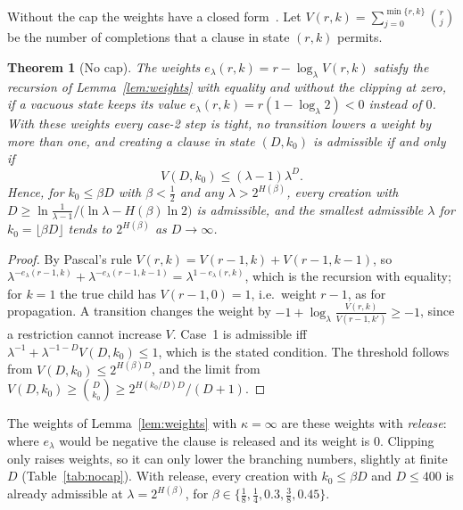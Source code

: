 \documentclass[11pt,a4paper]{article}
\newtheorem{theorem}{Theorem}
\theoremstyle{remark}
\begin{document}
Without the cap the weights have a closed form~\cite{N5}. Let
$V(r,k)=\sum_{j=0}^{\min\{r,k\}}\binom rj$ be the number of completions that a
clause in state $(r,k)$ permits.

\begin{theorem}[No cap]\label{thm:nocap}
The weights $e_\lambda(r,k)=r-\log_\lambda V(r,k)$ satisfy the recursion of
Lemma~\ref{lem:weights} with equality and without the clipping at zero, if a
vacuous state keeps its value $e_\lambda(r,k)=r(1-\log_\lambda2)<0$ instead of
$0$. With these weights every case-2 step is tight, no transition lowers a
weight by more than one, and creating a clause in state $(D,k_0)$ is admissible
if and only if
\[
 V(D,k_0)\le(\lambda-1)\lambda^D .
\]
Hence, for $k_0\le\beta D$ with $\beta<\frac12$ and any $\lambda>2^{H(\beta)}$,
every creation with $D\ge\ln\frac1{\lambda-1}\big/\bigl(\ln\lambda-H(\beta)\ln2
\bigr)$ is admissible, and the smallest admissible $\lambda$ for
$k_0=\lfloor\beta D\rfloor$ tends to $2^{H(\beta)}$ as $D\to\infty$.
\end{theorem}

\begin{proof}
By Pascal's rule $V(r,k)=V(r-1,k)+V(r-1,k-1)$, so
$\lambda^{-e_\lambda(r-1,k)}+\lambda^{-e_\lambda(r-1,k-1)}=\lambda^{1-e_\lambda(r,k)}$,
which is the recursion with equality; for $k=1$ the true child has
$V(r-1,0)=1$, i.e.\ weight $r-1$, as for propagation. A transition changes the
weight by $-1+\log_\lambda\frac{V(r,k)}{V(r-1,k')}\ge-1$, since a restriction
cannot increase $V$. Case~1 is admissible iff
$\lambda^{-1}+\lambda^{-1-D}V(D,k_0)\le1$, which is the stated condition. The
threshold follows from $V(D,k_0)\le2^{H(\beta)D}$, and the limit from
$V(D,k_0)\ge\binom D{k_0}\ge2^{H(k_0/D)D}/(D+1)$.
\end{proof}

The weights of Lemma~\ref{lem:weights} with $\kappa=\infty$ are these weights
with \emph{release}: where $e_\lambda$ would be negative the clause is released
and its weight is $0$. Clipping only raises weights, so it can only lower the
branching numbers, slightly at finite $D$ (Table~\ref{tab:nocap}). With release,
every creation with $k_0\le\beta D$ and $D\le400$ is already admissible at
$\lambda=2^{H(\beta)}$, for $\beta\in\{\frac18,\frac14,0.3,\frac38,0.45\}$.
\end{document}

